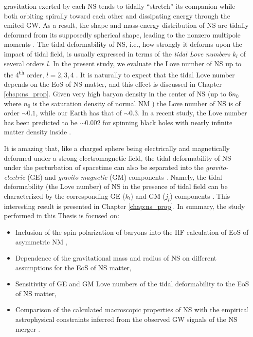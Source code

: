 gravitation exerted by each \gls{NS} tends to tidally ``stretch'' its companion while 
both orbiting spirally toward each other and dissipating energy through the emited 
\gls{GW}. As a result, the shape and mass-energy
distribution of \gls{NS} are tidally deformed from its supposedly spherical shape, 
leading to the nonzero multipole moments 
\citep{hinderer2008tidal,hinderer2010tidal,damour2009relativistic}. The tidal 
deformability of \gls{NS}, i.e., how strongly it deforms upon the impact of tidal field, 
is usually expressed in terms of the \emph{tidal Love numbers} $k_l$ of several orders 
$l$. In the present study, we evaluate the Love number of \gls{NS} 
up to the 4\textsuperscript{th} order, $l=2,3,4$ \citep{perot2021role}. It is naturally
to expect that the tidal Love number depends on the \gls{EoS} of NS matter, and this 
effect is discussed in Chapter \ref{chap:ns_prop}. Given very high baryon density in the
center of \gls{NS} (up to $6n_0$ where $n_0$ is the saturation density of normal NM ) 
the Love number of NS is of order $\sim 0.1$, while our Earth has that of $\sim 0.3$. 
In a recent study, the Love number has been predicted to be $\sim 0.002$ for spinning 
black holes with nearly infinite matter density inside \citep{le2021spinning}.

It is amazing that, like a charged sphere being electrically and magnetically deformed 
under a strong electromagnetic field, the tidal deformability of NS under the perturbation 
of spacetime can also be separated into the \emph{gravito-electric} (\gls{GE}) 
and \emph{gravito-magnetic} (\gls{GM}) components \citep{damour2009relativistic}. 
Namely, the tidal deformability (the Love number) of \gls{NS}  in the presence of tidal 
field can be characterized by the corresponding \gls{GE} ($k_l$) and \gls{GM} ($j_l$) 
components \citep{perot2021role}. This interesting result is presented in 
Chapter \ref{chap:ns_prop}. In summary, the study performed in this Thesis is focused on:
\begin{itemize}
        \item Inclusion of the spin polarization of baryons into the HF calculation
				of EoS of asymmetric NM \citep{tan2021equation},
        \item Dependence of the gravitational mass and radius of \gls{NS} on 
				different assumptions for the \gls{EoS} of NS matter,
        \item Sensitivity of \gls{GE} and \gls{GM} Love numbers of the tidal deformability 
				to the EoS of NS matter,
        \item Comparison of the calculated macroscopic properties of NS with the empirical
				astrophysical constraints inferred from the observed GW signals of the NS merger 
				\citep{abbott2018gw170817,xie2019bayesian}.
\end{itemize}

